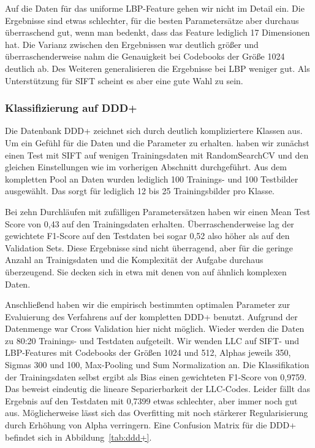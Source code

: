 Auf die Daten für das uniforme LBP-Feature gehen wir nicht im Detail ein. Die Ergebnisse sind etwas schlechter, für die besten Parametersätze aber durchaus überraschend gut, wenn man bedenkt, dass das Feature lediglich 17 Dimensionen hat. Die Varianz zwischen den Ergebnissen war deutlich größer und überraschenderweise nahm die Genauigkeit bei Codebooks der Größe 1024 deutlich ab. Des Weiteren generalisieren die Ergebnisse bei LBP weniger gut. Als Unterstützung für SIFT scheint es aber eine gute Wahl zu sein.

\subsubsection{Klassifizierung auf DDD+}

Die Datenbank DDD+ zeichnet sich durch deutlich kompliziertere Klassen aus. Um ein Gefühl für die Daten und die Parameter zu erhalten. haben wir zunächst einen Test mit SIFT auf wenigen Trainingsdaten mit RandomSearchCV und den gleichen Einstellungen wie im vorherigen Abschnitt durchgeführt. Aus dem kompletten Pool an Daten wurden lediglich 100 Trainings- und 100 Testbilder ausgewählt. Das sorgt für lediglich 12 bis 25 Trainingsbilder pro Klasse.

Bei zehn Durchläufen mit zufälligen Parametersätzen haben wir einen Mean Test Score von 0,43 auf den Trainingsdaten erhalten. Überraschenderweise lag der gewichtete F1-Score auf den Testdaten bei sogar 0,52 also höher als auf den Validation Sets. Diese Ergebnisse sind nicht überragend, aber für die geringe Anzahl an Trainigsdaten und die Komplexität der Aufgabe durchaus überzeugend. Sie decken sich in etwa mit denen von \cite{wyylhg10y} auf ähnlich komplexen Daten.

Anschließend haben wir die empirisch bestimmten optimalen Parameter zur Evaluierung des Verfahrens auf der kompletten DDD+ benutzt. Aufgrund der Datenmenge war Cross Validation hier nicht möglich. Wieder werden die Daten zu 80:20 Trainings- und Testdaten aufgeteilt. Wir wenden LLC auf SIFT- und LBP-Features mit Codebooks der Größen 1024 und 512, Alphas jeweils 350, Sigmas 300 und 100, Max-Pooling und Sum Normalization an. Die Klassifikation der Trainingsdaten selbst ergibt als Bias einen gewichteten F1-Score von 0,9759. Das beweist eindeutig die lineare Separierbarkeit der LLC-Codes. Leider fällt das Ergebnis auf den Testdaten mit 0,7399 etwas schlechter, aber immer noch gut aus. Möglicherweise lässt sich das Overfitting mit noch stärkerer Regularisierung durch Erhöhung von Alpha verringern. Eine Confusion Matrix für die DDD+ befindet sich in Abbildung~\ref{tab:ddd+}.

